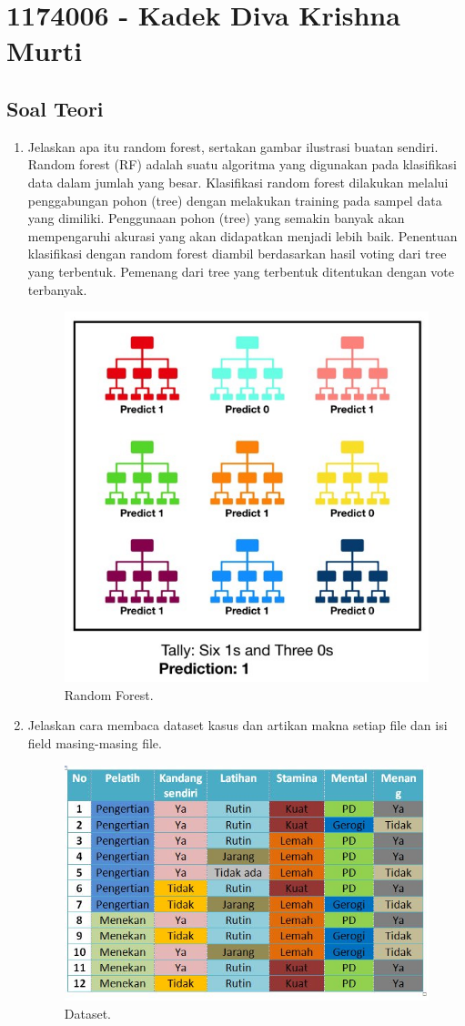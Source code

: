 \section{1174006 - Kadek Diva Krishna Murti}
\subsection{Soal Teori}
\begin{enumerate}

	\item Jelaskan apa itu random forest, sertakan gambar ilustrasi buatan sendiri.
	\hfill\break
	Random forest (RF) adalah suatu algoritma yang digunakan pada klasifikasi data dalam jumlah yang besar. Klasifikasi random forest dilakukan melalui penggabungan pohon (tree) dengan melakukan training pada sampel data yang dimiliki. Penggunaan pohon (tree) yang semakin banyak akan mempengaruhi akurasi yang akan didapatkan menjadi lebih baik. Penentuan klasifikasi dengan random forest diambil berdasarkan hasil voting dari tree yang terbentuk. Pemenang dari tree yang terbentuk ditentukan dengan vote terbanyak.

	\begin{figure}[H]
	\centering
		\includegraphics[width=8 cm]{figures/1174006/chapter3/soalteori/1.jpeg}
		\caption{Random Forest.}
	\end{figure}

	\item Jelaskan cara membaca dataset kasus dan artikan makna setiap file dan isi field masing-masing file.
	\hfill\break

	\begin{figure}[H]
		\centering
		\includegraphics[width=8 cm]{figures/1174006/chapter3/soalteori/2.jpg}
		\caption{Dataset.}
	\end{figure}


\end{enumerate}
